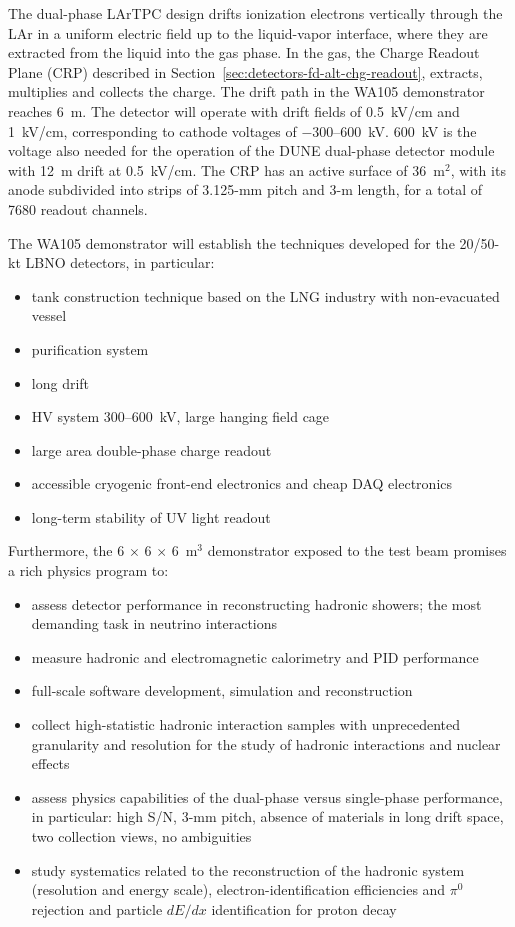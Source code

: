 {The dual-phase LArTPC design drifts ionization electrons
vertically through the LAr in a uniform electric field up to the
liquid-vapor interface, where they are extracted from the liquid into
the gas phase.
In the gas, the Charge Readout Plane (CRP) described in
Section~\ref{sec:detectors-fd-alt-chg-readout}, 
extracts, multiplies and collects the charge. 
%
The drift path in the WA105 demonstrator reaches 6~m. The detector
will operate with drift fields of 0.5~kV/cm and 1~kV/cm, corresponding
to cathode voltages of $-$300--600~kV. 600~kV is the voltage also
needed for the operation of the DUNE dual-phase detector module with 12~m drift at
0.5~kV/cm. The CRP has an active surface of 36~m$^2$, with its anode subdivided into
strips of 3.125-mm pitch and 3-m length, for a total of \num{7680}
readout channels.

The WA105 demonstrator will establish the techniques developed for
the 20/50-kt LBNO detectors, in particular:
\begin{itemize}
\item{tank construction technique based on the LNG industry with non-evacuated vessel}
\item{purification system}
\item{long drift}
\item{HV system 300--600~kV, large hanging field cage}
\item{large area double-phase charge readout}
\item{accessible cryogenic front-end electronics and cheap DAQ electronics}
\item{long-term stability of UV light readout}
\end{itemize}

Furthermore, the 6 $\times$ 6 $\times$ 6~m$^3$ demonstrator exposed to the
test beam promises a rich physics program to:
\begin{itemize}
\item{assess detector performance in reconstructing hadronic showers; the most demanding task in neutrino interactions}
\item{measure hadronic and electromagnetic calorimetry and PID performance}
\item{full-scale software development, simulation and reconstruction}
\item{collect high-statistic hadronic interaction samples with unprecedented granularity and resolution for the study of hadronic interactions and nuclear effects}
\item{assess physics capabilities of the dual-phase versus
  single-phase performance, in particular: high S/N, 3-mm pitch,
  absence of materials in long drift space, two collection views, no
  ambiguities}
\item{study systematics related to
  the reconstruction of the hadronic system (resolution and energy
  scale), electron-identification efficiencies and $\pi^0$ rejection and particle $dE/dx$ identification for proton decay}
\end{itemize}



}

